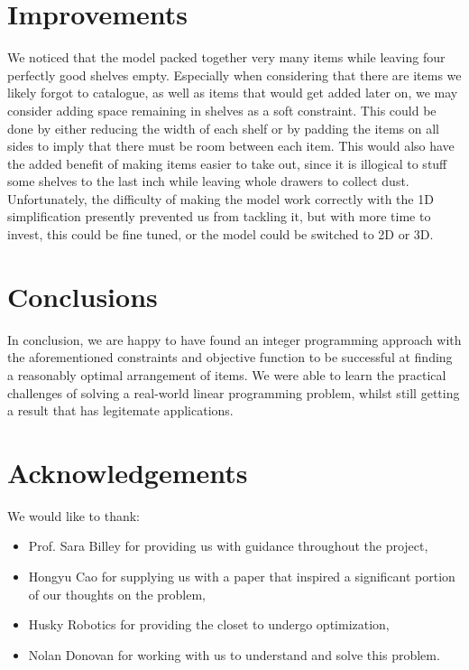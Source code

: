 \documentclass[10pt]{article}
\theoremstyle{named}
\begin{document}
\section{Improvements}
We noticed that the model packed together very many items while leaving four
perfectly good shelves empty. Especially when considering that there are items
we likely forgot to catalogue, as well as items that would get added later on,
we may consider adding space remaining in shelves as a soft constraint. This
could be done by either reducing the width of each shelf or by padding the
items on all sides to imply that there must be room between each item. This
would also have the added benefit of making items easier to take out, since
it is illogical to stuff some shelves to the last inch while leaving whole
drawers to collect dust. Unfortunately, the difficulty of making the model work correctly with the 1D simplification presently prevented us from tackling it, but with more time to invest, this could be fine tuned, or the model could be switched to 2D or 3D.

\section{Conclusions}
In conclusion, we are happy to have found an integer programming approach
with the aforementioned constraints and objective function to be successful
at finding a reasonably optimal arrangement of items. We were able to learn
the practical challenges of solving a real-world linear programming problem,
whilst still getting a result that has legitemate applications. 

\section{Acknowledgements}
We would like to thank:
\begin{itemize}
\item Prof. Sara Billey for providing us with guidance throughout the project,
\item Hongyu Cao for supplying us with a paper that inspired a significant portion of our thoughts on the problem,
\item Husky Robotics for providing the closet to undergo optimization,
\item Nolan Donovan for working with us to understand and solve this problem.
\end{itemize}
\end{document}
